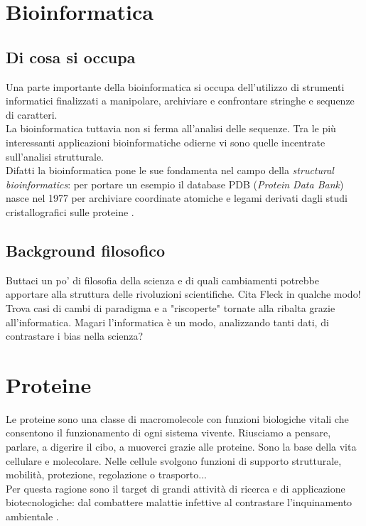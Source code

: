 \chapter{Bioinformatica}
\section{Di cosa si occupa}
\par Una parte importante della bioinformatica si occupa dell'utilizzo di strumenti informatici finalizzati a manipolare, archiviare e confrontare stringhe e sequenze di caratteri.\\
La bioinformatica tuttavia non si ferma all’analisi delle sequenze. Tra le più interessanti applicazioni bioinformatiche odierne vi sono quelle incentrate sull’analisi strutturale. \\
Difatti la bioinformatica pone le sue fondamenta nel campo della \textit{structural bioinformatics}: per portare un esempio il database PDB (\textit{Protein Data Bank}) nasce nel 1977 per archiviare coordinate atomiche e legami derivati dagli studi cristallografici sulle proteine \parencite{bernstein77}. \par

\section{Background filosofico}
Buttaci un po' di filosofia della scienza e di quali cambiamenti potrebbe apportare alla struttura delle rivoluzioni scientifiche. Cita Fleck in qualche modo!
Trova casi di cambi di paradigma e a "riscoperte" tornate alla ribalta grazie all'informatica. Magari l'informatica è un modo, analizzando tanti dati, di contrastare i bias nella scienza?

\chapter{Proteine}
Le proteine sono una classe di macromolecole con funzioni biologiche vitali che consentono il funzionamento di ogni sistema vivente. Riusciamo a pensare, parlare, a digerire il cibo, a muoverci grazie alle proteine. Sono la base della vita cellulare e molecolare. Nelle cellule svolgono funzioni di supporto strutturale, mobilità, protezione, regolazione o trasporto... \\



Per questa ragione sono il target di grandi attività di ricerca e di applicazione biotecnologiche: dal combattere malattie infettive \cite{batool2019structure} al contrastare l'inquinamento ambientale \cite{knott2020characterization}.


